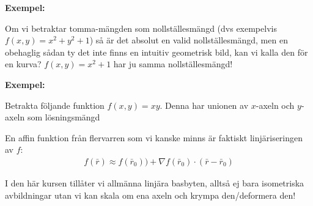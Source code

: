 \par\bigskip
\noindent\textbf{Exempel:}\par
\noindent Om vi betraktar tomma-mängden som nollställesmängd (dvs exempelvis $f(x,y) = x^2+y^2+1$) så är det absolut en valid nollställesmängd, men en obehaglig sådan ty det inte finns en intuitiv geometrisk bild, kan vi kalla den för en kurva? $f(x,y) = x^2+1$ har ju samma nollställesmängd!
\par\bigskip
\noindent\textbf{Exempel:}\par
\noindent Betrakta följande funktion $f(x,y)=xy$. Denna har unionen av $x$-axeln och $y$-axeln som lösningsmängd
\par\bigskip
\noindent En affin funktion från flervarren som vi kanske minns är faktiskt linjäriseringen av $f$:
\begin{equation*}
  \begin{gathered}
    f(\bar{r})\approx f(\bar{r}_0))+\nabla f(\bar{r}_0)\cdot (\bar{r}-\bar{r}_0)
  \end{gathered}
\end{equation*}
\par\bigskip
\noindent I den här kursen tillåter vi allmänna linjära basbyten, alltså ej bara isometriska avbildningar utan vi kan skala om ena axeln och krympa den/deformera den!
